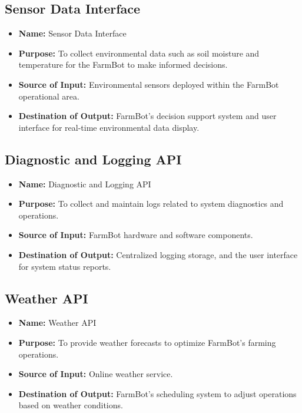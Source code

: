 \subsection{Sensor Data Interface}
\begin{itemize}
    \item \textbf{Name:} Sensor Data Interface
    \item \textbf{Purpose:} To collect environmental data such as soil moisture and temperature for the FarmBot to make informed decisions.
    \item \textbf{Source of Input:} Environmental sensors deployed within the FarmBot operational area.
    \item \textbf{Destination of Output:} FarmBot's decision support system and user interface for real-time environmental data display.
\end{itemize}

\subsection{Diagnostic and Logging API}
\begin{itemize}
    \item \textbf{Name:} Diagnostic and Logging API
    \item \textbf{Purpose:} To collect and maintain logs related to system diagnostics and operations.
    \item \textbf{Source of Input:} FarmBot hardware and software components.
    \item \textbf{Destination of Output:} Centralized logging storage, and the user interface for system status reports.
\end{itemize}

\subsection{Weather API}
\begin{itemize}
    \item \textbf{Name:} Weather API
    \item \textbf{Purpose:} To provide weather forecasts to optimize FarmBot's farming operations.
    \item \textbf{Source of Input:} Online weather service.
    \item \textbf{Destination of Output:} FarmBot's scheduling system to adjust operations based on weather conditions.
\end{itemize}

